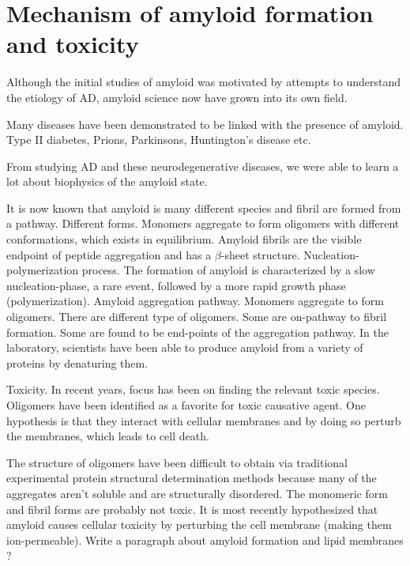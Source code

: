 \section{Mechanism of amyloid formation and toxicity}
\begin{outline}[enumerate]
\1 Although the initial studies of amyloid was motivated by attempts to understand the etiology of AD, amyloid science now have grown into its own field.

\1 Many diseases have been demonstrated to be linked with the presence of amyloid. Type II diabetes, Prions, Parkinsons, Huntington's disease etc.

\1 From studying AD and these neurodegenerative diseases, we were able to learn a lot about biophysics of the amyloid state.

  \2 It is now known that amyloid is many different species and fibril are formed from a pathway. Different forms. Monomers aggregate to form oligomers with different conformations, which exists in equilibrium.  Amyloid fibrils are the visible endpoint of peptide aggregation and has a $\beta$-sheet structure.
  \2 Nucleation-polymerization process. The formation of amyloid is characterized by a slow nucleation-phase, a rare event, followed by a more rapid growth phase (polymerization). Amyloid aggregation pathway. Monomers aggregate to form oligomers. There are different type of oligomers. Some are on-pathway to fibril formation. Some are found to be end-points of the aggregation pathway.
  \2 In the laboratory, scientists have been able to produce amyloid from a variety of proteins by denaturing them.

\1 Toxicity. In recent years, focus has been on finding the relevant toxic species. Oligomers have been identified as a favorite for toxic causative agent.  One hypothesis is that they interact with cellular membranes and by doing so perturb the membranes, which leads to cell death.

\1 The structure of oligomers have been difficult to obtain via traditional experimental protein structural determination methods because many of the aggregates aren't soluble and are structurally disordered.   
  \2 The monomeric form and fibril forms are probably not toxic. It is most recently hypothesized that amyloid causes cellular toxicity by perturbing the cell membrane (making them ion-permeable).
  \2 Write a paragraph about amyloid formation and lipid membranes ?
\end{outline}


